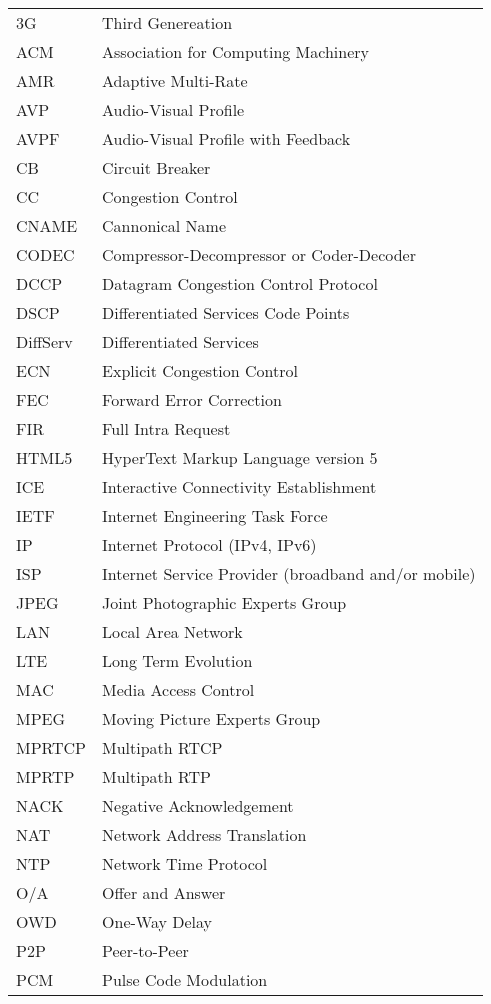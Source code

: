 \begin{longtable}{ll}
3G  	& Third Genereation \\
ACM 	& Association for Computing Machinery \\
AMR 	& Adaptive Multi-Rate \\
AVP 	& Audio-Visual Profile \\
AVPF	& Audio-Visual Profile with Feedback \\
CB  	& Circuit Breaker \\
CC  	& Congestion Control \\
CNAME	& Cannonical Name \\
CODEC	& Compressor-Decompressor or Coder-Decoder \\
DCCP 	& Datagram Congestion Control Protocol \\
DSCP 	& Differentiated Services Code Points \\
DiffServ	& Differentiated Services \\
ECN  	& Explicit Congestion Control \\
FEC  	& Forward Error Correction \\
FIR 	& Full Intra Request \\
HTML5	& HyperText Markup Language version 5\\
ICE  	& Interactive Connectivity Establishment \\
IETF	& Internet Engineering Task Force \\
IP  	& Internet Protocol (IPv4, IPv6)\\
ISP 	& Internet Service Provider (broadband and/or mobile) \\
JPEG 	& Joint Photographic Experts Group \\
LAN 	& Local Area Network \\
LTE 	& Long Term Evolution \\
MAC 	& Media Access Control \\
MPEG 	& Moving Picture Experts Group \\
MPRTCP	& Multipath RTCP \\
MPRTP 	& Multipath RTP \\
NACK 	& Negative Acknowledgement \\
NAT 	& Network Address Translation \\
NTP  	& Network Time Protocol \\
O/A  	& Offer and Answer \\
OWD 	& One-Way Delay \\
P2P 	& Peer-to-Peer \\
PCM 	& Pulse Code Modulation \\

\end{longtable}
